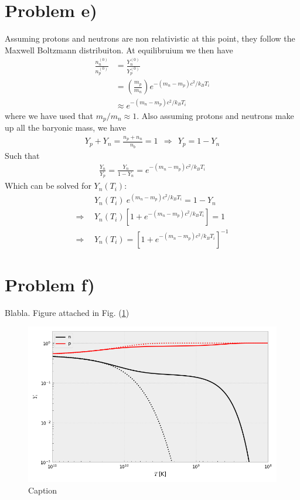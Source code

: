 \documentclass[reprint,english,notitlepage]{revtex4-1}  %
\numberwithin{equation}{section}
\begin{document}
\section{Problem e)}
Assuming protons and neutrons are non relativistic at this point, they follow
the Maxwell Boltzmann distribuiton. At equilibruium we then have
\begin{align}
	\frac{n^{(0)}_n}{n^{(0)}_p} &= \frac{Y^{(0)}_n}{Y^{(0)}_p} \\
			&= \left(\frac{m_p}{m_n}\right) e^{-(m_n - m_p)c^2/k_B T_i} \\
			&\approx e^{-(m_n - m_p)c^2/k_B T_i}
\end{align}
where we have used that $m_p/m_n \approx 1$. Also assuming protons and neutrons
make up all the baryonic mass, we have
\begin{align}
	Y_p + Y_n = \frac{n_p + n_n}{n_b} = 1 \ \ \Rightarrow \ \ Y_p = 1 - Y_n
\end{align}
Such that
\begin{align}
	\frac{Y_n}{Y_p} = \frac{Y_n}{1 - Y_n} = e^{-(m_n - m_p)c^2/k_B T_i}
\end{align}
Which can be solved for $Y_n(T_i)$:
\begin{align}
&Y_n(T_i)\ e^{(m_n - m_p)c^2/k_B T_i} = 1 - Y_n \\
\Rightarrow\ \  &Y_n(T_i) \left[1 + e^{-(m_n - m_p)c^2/k_B T_i}\right] = 1 \\
\Rightarrow\ \  &Y_n(T_i) = \left[1 + e^{-(m_n - m_p)c^2/k_B T_i}\right]^{-1}
\end{align}

\section{Problem f)}
Blabla. Figure attached in Fig. (\ref{fig:problem_f})
\begin{figure}[h!]
	\includegraphics[width=12cm]{densities.png}
	\caption{Caption}
	\label{fig:problem_f}
\end{figure}
\end{document}
